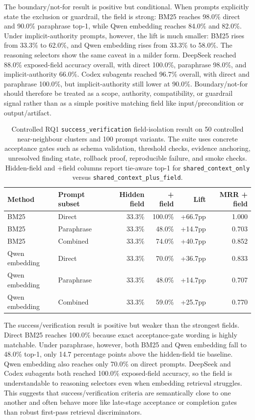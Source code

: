 The boundary/not-for result is positive but conditional. When prompts explicitly state the exclusion or guardrail, the field is strong: BM25 reaches 98.0\% direct and 90.0\% paraphrase top-1, while Qwen embedding reaches 84.0\% and 82.0\%. Under implicit-authority prompts, however, the lift is much smaller: BM25 rises from 33.3\% to 62.0\%, and Qwen embedding rises from 33.3\% to 58.0\%. The reasoning selectors show the same caveat in a milder form. DeepSeek reached 88.0\% exposed-field accuracy overall, with direct 100.0\%, paraphrase 98.0\%, and implicit-authority 66.0\%. Codex subagents reached 96.7\% overall, with direct and paraphrase 100.0\%, but implicit-authority still lower at 90.0\%. Boundary/not-for should therefore be treated as a scope, authority, compatibility, or guardrail signal rather than as a simple positive matching field like input/precondition or output/artifact.

\begin{table}[H]
\centering
\scriptsize
\setlength{\tabcolsep}{2pt}
\begin{tabular}{p{}p{}rrrr}
\toprule
Method & Prompt subset & Hidden field & + field & Lift & MRR + field \\
\midrule
BM25 & Direct & 33.3\% & 100.0\% & +66.7pp & 1.000 \\
BM25 & Paraphrase & 33.3\% & 48.0\% & +14.7pp & 0.703 \\
BM25 & Combined & 33.3\% & 74.0\% & +40.7pp & 0.852 \\
Qwen embedding & Direct & 33.3\% & 70.0\% & +36.7pp & 0.833 \\
Qwen embedding & Paraphrase & 33.3\% & 48.0\% & +14.7pp & 0.707 \\
Qwen embedding & Combined & 33.3\% & 59.0\% & +25.7pp & 0.770 \\
\bottomrule
\end{tabular}
\caption{Controlled RQ1 \texttt{success\_verification} field-isolation result on 50 controlled near-neighbour clusters and 100 prompt variants. The suite uses concrete acceptance gates such as schema validation, threshold checks, evidence anchoring, unresolved finding state, rollback proof, reproducible failure, and smoke checks. Hidden-field and +field columns report tie-aware top-1 for \texttt{shared\_context\_only} versus \texttt{shared\_context\_plus\_field}.}
\label{tab:rq1a-success-verification-isolation}
\end{table}

The success/verification result is positive but weaker than the strongest fields. Direct BM25 reaches 100.0\% because exact acceptance-gate wording is highly matchable. Under paraphrase, however, both BM25 and Qwen embedding fall to 48.0\% top-1, only 14.7 percentage points above the hidden-field tie baseline. Qwen embedding also reaches only 70.0\% on direct prompts. DeepSeek and Codex subagents both reached 100.0\% exposed-field accuracy, so the field is understandable to reasoning selectors even when embedding retrieval struggles. This suggests that success/verification criteria are semantically close to one another and often behave more like late-stage acceptance or completion gates than robust first-pass retrieval discriminators.

